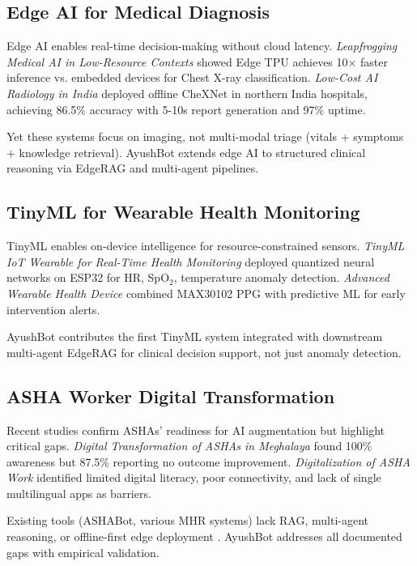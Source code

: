 \documentclass[conference,compsoc]{IEEEtran}
\begin{document}
\subsection{Edge AI for Medical Diagnosis}

Edge AI enables real-time decision-making without cloud latency. \textit{Leapfrogging Medical AI in Low-Resource Contexts} \cite{edge_tpu_lowres_2021} showed Edge TPU achieves 10× faster inference vs. embedded devices for Chest X-ray classification. \textit{Low-Cost AI Radiology in India} \cite{lowcost_ai_radiology_india} deployed offline CheXNet in northern India hospitals, achieving 86.5\% accuracy with 5-10s report generation and 97\% uptime.

Yet these systems focus on imaging, not multi-modal triage (vitals + symptoms + knowledge retrieval). AyushBot extends edge AI to structured clinical reasoning via EdgeRAG and multi-agent pipelines.

\subsection{TinyML for Wearable Health Monitoring}

TinyML enables on-device intelligence for resource-constrained sensors. \textit{TinyML IoT Wearable for Real-Time Health Monitoring} \cite{tinyml_wearable_esp32_2025} deployed quantized neural networks on ESP32 for HR, SpO\(_2\), temperature anomaly detection. \textit{Advanced Wearable Health Device} \cite{wearable_health_predictor_2024} combined MAX30102 PPG with predictive ML for early intervention alerts.

AyushBot contributes the first TinyML system integrated with downstream multi-agent EdgeRAG for clinical decision support, not just anomaly detection.

\subsection{ASHA Worker Digital Transformation}

Recent studies confirm ASHAs' readiness for AI augmentation but highlight critical gaps. \textit{Digital Transformation of ASHAs in Meghalaya} \cite{meghalaya_asha_2025} found 100\% awareness but 87.5\% reporting no outcome improvement. \textit{Digitalization of ASHA Work} \cite{asha_digital_challenges_2024} identified limited digital literacy, poor connectivity, and lack of single multilingual apps as barriers.

Existing tools (ASHABot, various MHR systems) lack RAG, multi-agent reasoning, or offline-first edge deployment \cite{ashabot_survey}. AyushBot addresses all documented gaps with empirical validation.
\end{document}
